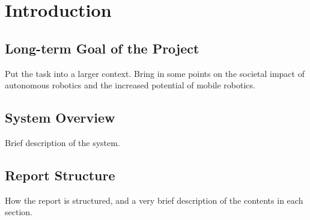 \section{Introduction}

\subsection{Long-term Goal of the Project}

Put the task into a larger context. Bring in some points on the societal impact of autonomous robotics and the increased potential of mobile robotics.  

\subsection{System Overview}

Brief description of the system.

\subsection{Report Structure}
How the report is structured, and a very brief description of the contents in each section.